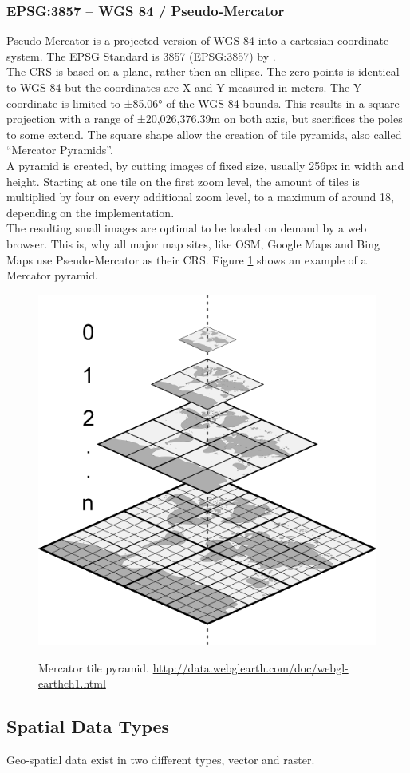 \subsubsection{EPSG:3857 -- WGS 84 / Pseudo-Mercator}
Pseudo-Mercator is a projected version of WGS 84 into a cartesian coordinate system. The EPSG Standard is 3857 (EPSG:3857) by \cite{Grafarend1995}.\\
The CRS is based on a plane, rather then an ellipse. The zero points is identical to WGS 84 but the coordinates are X and Y measured in meters. The Y coordinate is limited to ±85.06° of the WGS 84 bounds. This results in a square projection with a range of ±20,026,376.39m on both axis, but sacrifices the poles to some extend. The square shape allow the creation of tile pyramids, also called \enquote{Mercator Pyramids}. \\
A pyramid is created, by cutting images of fixed size, usually 256px in width and height. Starting at one tile on the first zoom level, the amount of tiles is multiplied by four on every additional zoom level, to a maximum of around 18, depending on the implementation. \\
The resulting small images are optimal to be loaded on demand by a web browser. This is, why all major map sites, like OSM, Google Maps and Bing Maps use Pseudo-Mercator as their CRS. Figure \ref{img:mercator-pyramid} shows an example of a Mercator pyramid.
\begin{figure}[H]
	\centering
	\includegraphics[width=0.4\columnwidth]{res/mercator-pyramid}\\
	\caption[]{Mercator tile pyramid. \url{http://data.webglearth.com/doc/webgl-earthch1.html}}
	\label{img:mercator-pyramid}
\end{figure}


\subsection{Spatial Data Types}
Geo-spatial data exist in two different types, vector and raster. 

